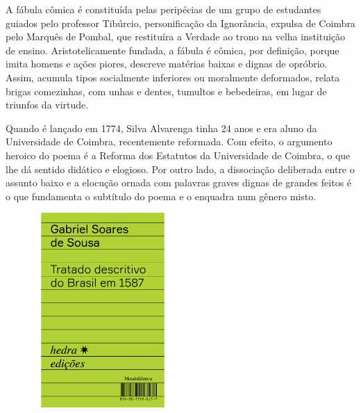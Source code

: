 \hspace*{-7cm}\hrulefill\hspace*{-7cm}

\medskip

\noindent{}A fábula cômica é constituída pelas peripécias de um grupo de estudantes guiados pelo professor Tibúrcio, personificação da Ignorância, expulsa de Coimbra pelo Marquês de Pombal, que restituíra a Verdade ao trono na velha instituição de ensino. Aristotelicamente fundada, a fábula é cômica, por definição, porque imita homens e ações piores, descreve matérias baixas e dignas de opróbrio. Assim, acumula tipos socialmente inferiores ou moralmente deformados, relata brigas comezinhas, com unhas e dentes, tumultos e bebedeiras, em lugar de triunfos da virtude.

Quando {} é lançado em 1774, Silva Alvarenga tinha 24 anos e era aluno da Universidade de Coimbra, recentemente reformada. Com efeito, o argumento heroico do poema é a Reforma dos Estatutos da Universidade de Coimbra, o que lhe dá sentido didático e elogioso. Por outro lado, a dissociação deliberada entre o assunto baixo e a elocução ornada com palavras graves dignas de grandes feitos é o que fundamenta o subtítulo do poema e o enquadra num gênero misto.

\vfill

\hspace*{-.4cm}\begin{minipage}[c]{.5\linewidth}
\small{
{}}
\end{minipage}

\pagebreak

\begin{center}
\hspace*{.5cm}\includegraphics[width=74mm]{./grid/tratado.png}
\end{center}

